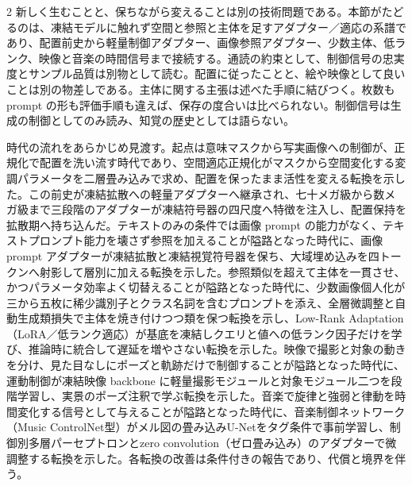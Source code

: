 \documentclass[lualatex,a4paper,10pt]{jlreq}
\begin{document}
\begin{multicols}{2}
\raggedcolumns
新しく生むことと、保ちながら変えることは別の技術問題である。本節がたどるのは、凍結モデルに触れず空間と参照と主体を足すアダプター／適応の系譜であり、配置前史から軽量制御アダプター、画像参照アダプター、少数主体、低ランク、映像と音楽の時間信号まで接続する\autocite{btd041,btd037,btd039,btd042}。通読の約束として、制御信号の忠実度とサンプル品質は別物として読む。配置に従ったことと、絵や映像として良いことは別の物差しである。主体に関する主張は述べた手順に結びつく。枚数も prompt の形も評価手順も違えば、保存の度合いは比べられない。制御信号は生成の制御としてのみ読み、知覚の歴史としては語らない。

時代の流れをあらかじめ見渡す。起点は意味マスクから写実画像への制御が、正規化で配置を洗い流す時代であり、空間適応正規化がマスクから空間変化する変調パラメータを二層畳み込みで求め、配置を保ったまま活性を変える転換を示した\autocite{btd041}。この前史が凍結拡散への軽量アダプターへ継承され、七十メガ級から数メガ級まで三段階のアダプターが凍結符号器の四尺度へ特徴を注入し、配置保持を拡散期へ持ち込んだ\autocite{btd037}。テキストのみの条件では画像 prompt の能力がなく、テキストプロンプト能力を壊さず参照を加えることが隘路となった時代に、画像 prompt アダプターが凍結拡散と凍結視覚符号器を保ち、大域埋め込みを四トークンへ射影して層別に加える転換を示した\autocite{btd038}。参照類似を超えて主体を一貫させ、かつパラメータ効率よく切替えることが隘路となった時代に、少数画像個人化が三から五枚に稀少識別子とクラス名詞を含むプロンプトを添え、全層微調整と自動生成類損失で主体を焼き付けつつ類を保つ転換を示し\autocite{btd039}、Low-Rank Adaptation（LoRA／低ランク適応）が基底を凍結しクエリと値への低ランク因子だけを学び、推論時に統合して遅延を増やさない転換を示した\autocite{btd040}。映像で撮影と対象の動きを分け、見た目なしにポーズと軌跡だけで制御することが隘路となった時代に、運動制御が凍結映像 backbone に軽量撮影モジュールと対象モジュール二つを段階学習し、実景のポーズ注釈で学ぶ転換を示した\autocite{btd042}。音楽で旋律と強弱と律動を時間変化する信号として与えることが隘路となった時代に、音楽制御ネットワーク（Music ControlNet型）がメル図の畳み込みU-Netをタグ条件で事前学習し、制御別多層パーセプトロンとzero convolution（ゼロ畳み込み）のアダプターで微調整する転換を示した\autocite{btd043}。各転換の改善は条件付きの報告であり、代償と境界を伴う。
\end{multicols}
\end{document}
